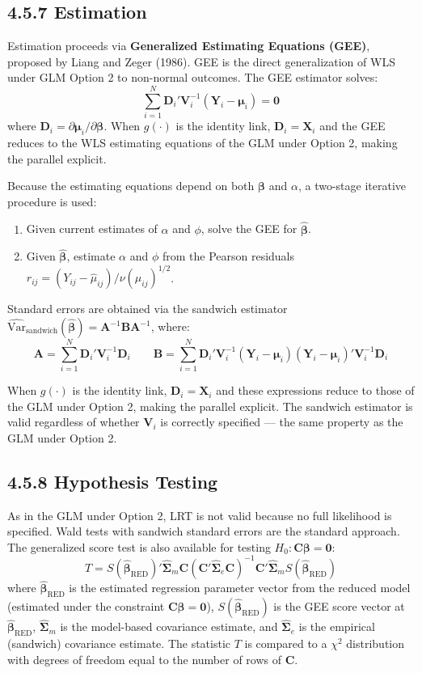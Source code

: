 \documentclass[11pt]{article}
\newcommand{\bY}{\mathbf{Y}}
\newcommand{\bX}{\mathbf{X}}
\newcommand{\bbeta}{\boldsymbol{\beta}}
\newcommand{\bmu}{\boldsymbol{\mu}}
\newcommand{\Var}{\mathrm{Var}}
\begin{document}
\subsection*{4.5.7 Estimation}

Estimation proceeds via \textbf{Generalized Estimating Equations (GEE)}, proposed by Liang and Zeger (1986). GEE is the direct generalization of WLS under GLM Option 2 to non-normal outcomes. The GEE estimator solves:
$$\sum_{i=1}^N \mathbf{D}_i'\mathbf{V}_i^{-1}(\bY_i - \bmu_i) = \mathbf{0}$$
where $\mathbf{D}_i = \partial\bmu_i/\partial\bbeta$. When $g(\cdot)$ is the identity link, $\mathbf{D}_i = \bX_i$ and the GEE reduces to the WLS estimating equations of the GLM under Option 2, making the parallel explicit.

Because the estimating equations depend on both $\bbeta$ and $\alpha$, a two-stage iterative procedure is used:
\begin{enumerate}[leftmargin=2em]
  \item Given current estimates of $\alpha$ and $\phi$, solve the GEE for $\hat{\bbeta}$.
  \item Given $\hat{\bbeta}$, estimate $\alpha$ and $\phi$ from the Pearson residuals $r_{ij} = (Y_{ij} - \hat{\mu}_{ij})/\nu(\hat{\mu}_{ij})^{1/2}$.
\end{enumerate}

Standard errors are obtained via the sandwich estimator $\widehat{\Var}_{\text{sandwich}}(\hat{\bbeta}) = \mathbf{A}^{-1}\mathbf{B}\mathbf{A}^{-1}$, where:
$$\mathbf{A} = \sum_{i=1}^N \mathbf{D}_i'\mathbf{V}_i^{-1}\mathbf{D}_i \qquad \mathbf{B} = \sum_{i=1}^N \mathbf{D}_i'\mathbf{V}_i^{-1}(\bY_i - \bmu_i)(\bY_i - \bmu_i)'\mathbf{V}_i^{-1}\mathbf{D}_i$$

When $g(\cdot)$ is the identity link, $\mathbf{D}_i = \bX_i$ and these expressions reduce to those of the GLM under Option 2, making the parallel explicit. The sandwich estimator is valid regardless of whether $\mathbf{V}_i$ is correctly specified --- the same property as the GLM under Option 2.

\subsection*{4.5.8 Hypothesis Testing}

As in the GLM under Option 2, LRT is not valid because no full likelihood is specified. Wald tests with sandwich standard errors are the standard approach. The generalized score test is also available for testing $H_0: \mathbf{C}\bbeta = \mathbf{0}$:
$$T = S(\hat{\bbeta}_\text{RED})'\hat{\boldsymbol{\Sigma}}_m\mathbf{C}(\mathbf{C}'\hat{\boldsymbol{\Sigma}}_e\mathbf{C})^{-1}\mathbf{C}'\hat{\boldsymbol{\Sigma}}_mS(\hat{\bbeta}_\text{RED})$$
where $\hat{\bbeta}_\text{RED}$ is the estimated regression parameter vector from the reduced model (estimated under the constraint $\mathbf{C}\bbeta = \mathbf{0}$), $S(\hat{\bbeta}_\text{RED})$ is the GEE score vector at $\hat{\bbeta}_\text{RED}$, $\hat{\boldsymbol{\Sigma}}_m$ is the model-based covariance estimate, and $\hat{\boldsymbol{\Sigma}}_e$ is the empirical (sandwich) covariance estimate. The statistic $T$ is compared to a $\chi^2$ distribution with degrees of freedom equal to the number of rows of $\mathbf{C}$.
\end{document}
